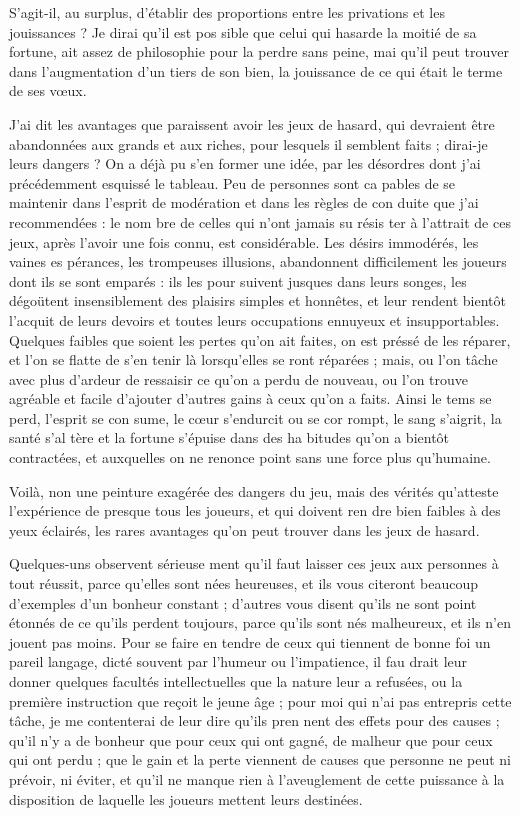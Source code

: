 S'agit-il, au surplus, d'établir des
proportions entre les privations et
les jouissances ? Je dirai qu'il est pos%
sible que celui qui hasarde la moitié
de sa fortune, ait assez de philosophie
pour la perdre sans peine, mai qu'il
peut trouver dans l'augmentation
d'un tiers de son bien, la jouissance
de ce qui était le terme de ses vœux.

J'ai dit les avantages que paraissent
avoir les jeux de hasard, qui devraient
être abandonnées aux grands et aux
riches, pour lesquels il semblent faits ;
dirai-je leurs dangers ? On a déjà pu
s'en former une idée, par les désordres
dont j'ai précédemment esquissé le
tableau. Peu de personnes sont ca%
pables de se maintenir dans l'esprit de
modération et dans les règles de con%
duite que j'ai recommendées : le nom%
bre de celles qui n'ont jamais su résis%
ter à l'attrait de ces jeux, après l'avoir
une fois connu, est considérable.
Les désirs immodérés, les vaines es%
pérances, les trompeuses illusions,
abandonnent difficilement les joueurs
dont ils se sont emparés : ils les pour%
suivent jusques dans leurs songes, les
dégoütent insensiblement des plaisirs
simples et honnêtes, et leur rendent
bientôt l'acquit de leurs devoirs et
toutes leurs occupations ennuyeux
et insupportables. Quelques faibles
que soient les pertes qu'on ait faites,
on est préssé de les réparer, et l'on se
flatte de s'en tenir là lorsqu'elles se%
ront réparées ; mais, ou l'on tâche
avec plus d'ardeur de ressaisir ce
qu'on a perdu de nouveau, ou l'on
trouve agréable et facile d'ajouter
d'autres gains à ceux qu'on a faits.
Ainsi le tems se perd, l'esprit se con%
sume, le cœur s'endurcit ou se cor%
rompt, le sang s'aigrit, la santé s'al%
tère et la fortune s'épuise dans des ha%
bitudes qu'on a bientôt contractées,
et auxquelles on ne renonce point
sans une force plus qu'humaine.

Voilà, non une peinture exagérée
des dangers du jeu, mais des vérités
qu'atteste l'expérience de presque
tous les joueurs, et qui doivent ren%
dre bien faibles à des yeux éclairés,
les rares avantages qu'on peut trouver
dans les jeux de hasard.

Quelques-uns observent sérieuse%
ment qu'il faut laisser ces jeux aux
personnes à tout réussit, parce
qu'elles sont nées heureuses, et ils
vous citeront beaucoup d'exemples
d'un bonheur constant ; d'autres vous
disent qu'ils ne sont point étonnés
de ce qu'ils perdent toujours, parce
qu'ils sont nés malheureux, et ils n'en
jouent pas moins. Pour se faire en%
tendre de ceux qui tiennent de bonne
foi un pareil langage, dicté souvent
par l'humeur ou l'impatience, il fau%
drait leur donner quelques facultés
intellectuelles que la nature leur a
refusées, ou la première instruction
que reçoit le jeune âge ; pour moi qui
n'ai pas entrepris cette tâche, je me
contenterai de leur dire qu'ils pren%
nent des effets pour des causes ; qu'il
n'y a de bonheur que pour ceux qui 
ont gagné, de malheur que pour ceux
qui ont perdu ; que le gain et la perte
viennent de causes que personne ne
peut ni prévoir, ni éviter, et qu'il ne
manque rien à l'aveuglement de cette
puissance à la disposition de laquelle
les joueurs mettent leurs destinées.
